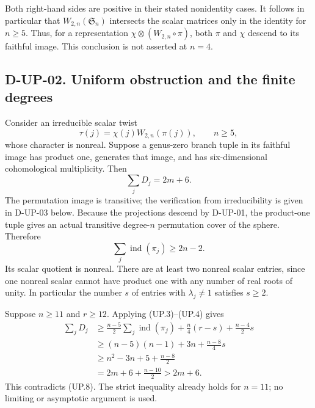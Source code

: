 Both right-hand sides are positive in their stated nonidentity cases.
It follows in particular that $W_{2,n}(\mathfrak S_n)$ intersects
the scalar matrices only in the identity for $n\ge5$.
Thus, for a representation $\chi\otimes(W_{2,n}\circ\pi)$,
both $\pi$ and $\chi$ descend to its faithful image.
This conclusion is not asserted at $n=4$.

\subsection*{D-UP-02. Uniform obstruction and the finite degrees}

Consider an irreducible scalar twist
\[
           \tau(j)=\chi(j)W_{2,n}(\pi(j)),\qquad n\ge5,
                                                               \tag{UP.7}
\]
whose character is nonreal.  Suppose a genus-zero branch tuple in
its faithful image has product one, generates that image, and has
six-dimensional cohomological multiplicity.  Then
\[
                    \sum_jD_j=2m+6.                    \tag{UP.8}
\]
The permutation image is transitive; the verification from
irreducibility is given in D-UP-03 below.  Because the projections
descend by D-UP-01, the product-one tuple gives an actual transitive
degree-$n$ permutation cover of the sphere.  Therefore
\[
                    \sum_j\operatorname{ind}(\pi_j)\ge2n-2.
                                                               \tag{UP.9}
\]
Its scalar quotient is nonreal.  There are at least two nonreal
scalar entries, since one nonreal scalar cannot have product one
with any number of real roots of unity.  In particular the number
$s$ of entries with $\lambda_j\ne1$ satisfies $s\ge2$.

Suppose $n\ge11$ and $r\ge12$.  Applying (UP.3)--(UP.4) gives
\begin{align*}
 \sum_jD_j
 &\ge \frac{n-5}{2}\sum_j\operatorname{ind}(\pi_j)
          +\frac n4(r-s)+\frac{n-4}{2}s\\
 &\ge (n-5)(n-1)+3n+\frac{n-8}{4}s\\
 &\ge n^2-3n+5+\frac{n-8}{2}\\
 &=2m+6+\frac{n-10}{2}>2m+6.
\end{align*}
This contradicts (UP.8).  The strict inequality already holds for
$n=11$; no limiting or asymptotic argument is used.

